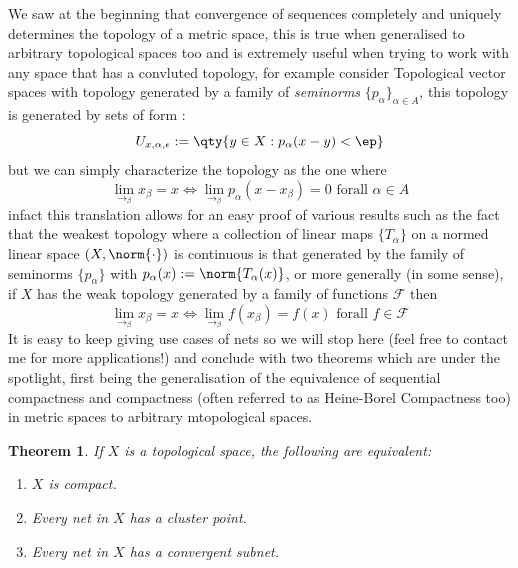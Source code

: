 \documentclass[12pt,english]{article}
\newtheorem{theorem}{Theorem}[section]
\begin{document}
We saw at the beginning that convergence of sequences completely and uniquely determines the topology of a metric space, this is true when generalised to arbitrary topological spaces too and is extremely useful when trying to work with any space that has a convluted topology, for example consider Topological vector spaces with topology generated by a family of \textit{seminorms} $\{p_\alpha\}_{\alpha\in A}$, this topology is generated by sets of form : 
\[
    U_{x,\alpha,\epsilon}:= \qty{y\in X : p_\alpha(x-y)<\ep}
\]
but we can simply characterize the topology as the one where 
\[
    \lim_{\longrightarrow_\beta}x_\beta=x\iff\lim_{\longrightarrow_\beta}p_\alpha(x-x_\beta)=0\text{ forall }\alpha\in A
\]
infact this translation allows for an easy proof of various results such as the fact that the weakest topology where a collection of linear maps $\{T_\alpha\}$ on a normed linear space $(X,\norm{\cdot})$ is continuous is that generated by the family of seminorms $\{p_\alpha\}$ with $p_\alpha(x):=\norm{T_\alpha(x)}$, or more generally (in some sense), if $X$ has the weak topology generated by a family of functions $\mathcal F$ then 
\[
    \lim_{\longrightarrow_\beta}x_\beta=x\iff\lim_{\longrightarrow_\beta}f(x_\beta)=f(x)\text{ forall }f\in\mathcal F
\]
It is easy to keep giving use cases of nets so we will stop here (feel free to contact me for more applications!) and conclude with two theorems which are under the spotlight, first being the generalisation of the equivalence of sequential compactness and compactness (often referred to as Heine-Borel Compactness too) in metric spaces to arbitrary mtopological spaces.
\begin{theorem}
If $X$ is a topological space, the following are equivalent:
\begin{enumerate}[label=\alph*.]
    \item $X$ is compact.
    \item Every net in $X$ has a cluster point.
    \item Every net in $X$ has a convergent subnet.
\end{enumerate}
\end{theorem}
\end{document}
